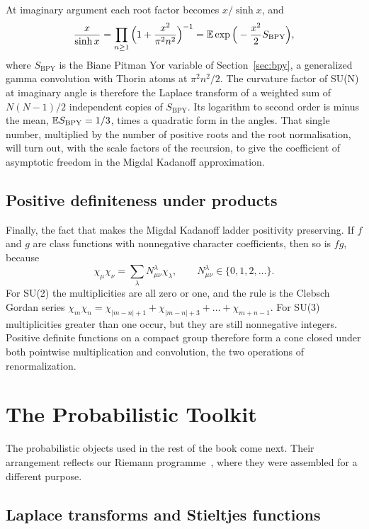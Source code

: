 At imaginary argument each root factor becomes $x/\sinh x$, and
\[
\frac{x}{\sinh x}=\prod_{n\ge1}\Big(1+\frac{x^2}{\pi^2n^2}\Big)^{-1}=\mathbb{E}\exp\Big(-\frac{x^2}{2}S_{\mathrm{BPY}}\Big),
\]
where $S_{\mathrm{BPY}}$ is the Biane Pitman Yor variable of Section~\ref{sec:bpy}, a generalized gamma convolution with Thorin atoms at $\pi^2n^2/2$. The curvature factor of SU(N) at imaginary angle is therefore the Laplace transform of a weighted sum of $N(N-1)/2$ independent copies of $S_{\mathrm{BPY}}$. Its logarithm to second order is minus the mean, $\mathbb{E} S_{\mathrm{BPY}}=1/3$, times a quadratic form in the angles. That single number, multiplied by the number of positive roots and the root normalisation, will turn out, with the scale factors of the recursion, to give the coefficient of asymptotic freedom in the Migdal Kadanoff approximation.

\subsection{Positive definiteness under products}\label{sec:pdprod}

Finally, the fact that makes the Migdal Kadanoff ladder positivity preserving. If $f$ and $g$ are class functions with nonnegative character coefficients, then so is $fg$, because
\[
\chi_\mu\chi_\nu=\sum_\lambda N^\lambda_{\mu\nu}\chi_\lambda,\qquad N^\lambda_{\mu\nu}\in\{0,1,2,\dots\}.
\]
For SU(2) the multiplicities are all zero or one, and the rule is the Clebsch Gordan series $\chi_m\chi_n=\chi_{|m-n|+1}+\chi_{|m-n|+3}+\dots+\chi_{m+n-1}$. For SU(3) multiplicities greater than one occur, but they are still nonnegative integers. Positive definite functions on a compact group therefore form a cone closed under both pointwise multiplication and convolution, the two operations of renormalization.

\section{The Probabilistic Toolkit}\label{ch:toolkit}

The probabilistic objects used in the rest of the book come next. Their arrangement reflects our Riemann programme~\cite{PS26a}, where they were assembled for a different purpose.

\subsection{Laplace transforms and Stieltjes functions}\label{sec:stieltjes}

